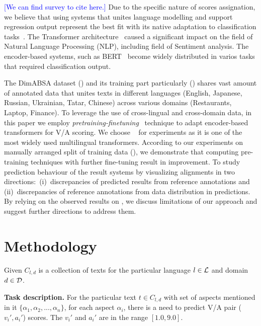 \documentclass[11pt]{article}
\begin{document}
\textcolor{blue}{[We can find survey to cite here.]}
Due to the specific nature of scores assignation, we believe that using systems that unites language modelling and support regression output represent the best fit with its native adaptation to classification tasks~\cite{rogers-etal-2020-primer}.
The Transformer architecture~\cite{vaswani2017attention} caused a significant impact on the field of Natural Language Processing (NLP), including field of Sentiment analysis. The encoder-based systems, such as BERT~\cite{devlin-etal-2019-bert, liu2019robertarobustlyoptimizedbert} become widely distributed in varios tasks that required classification output.

The DimABSA dataset (\dimabsaDataset{}) and its training part particularly (\dimabsaTrainData{}) shares vast amount of annotated data that unites texts in different languages (English, Japanese, Russian, Ukrainian, Tatar, Chinese) across various domains (Restaurants, Laptop, Finance). 
To leverage the use of cross-lingual and cross-domain data, in this paper we employ \textit{pretraining-finetuning}~\cite{wang2024tutorialpretrainfinetuneparadigmnatural} technique to adapt encoder-based transformers for V/A scoring. We choose \roberta{}~\cite{liu2019robertarobustlyoptimizedbert} for experiments as it is one of the most widely used multilingual transformers.
According to our experiments 
on manually arranged split of training data (\dimabsaTrainEval{}), 
we demonstrate that computing pre-training techniques with further fine-tuning result in \improvement{} improvement.
To study prediction behaviour of the result systems by visualizing alignments in two directions:~(i)~discrepancies of predicted results from reference annotations and (ii)~discrepancies of reference annotations from data distribution in predictions. 
By relying on the observed results on \dimabsaTrainEval{}, we discuss limitations of our approach and suggest further directions to address them.

\section{Methodology}
\label{sec:methodology}

Given $C_{l,d}$ is a collection of texts 
for the particular language $l \in \mathcal{L}{}$ and domain $d \in \mathcal{D}{}$. 

\textbf{Task description.} 
For the particular text $t \in C_{l,d}$ with set of aspects mentioned in it $\{\alpha_1, \alpha_2, ..., \alpha_n\}$, 
for each aspect $\alpha_i$, there is a need to predict V/A pair ($v_i', a_i'$) scores.
The $v_i'$ and $a_i'$ are in the range $[1.0, 9.0]$.
\end{document}
